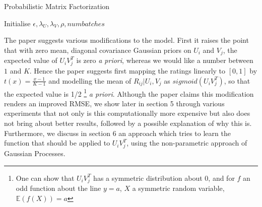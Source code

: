 \documentclass{article}
\theoremstyle{plain}
\begin{document}
\begin{algorithm}
    \SetAlgoNoLine
    \caption{Probabilistic Matrix Factorization}
        \BlankLine
        Initialise $\epsilon,\lambda_U,\lambda_V,\rho ,numbatches$ \;
\end{algorithm}

The paper suggests various modifications to the model. First it raises the point that with zero mean, diagonal covariance Gaussian priors on $U_i$ and $V_j$, the expected value of $U_iV_j^T$ is zero \textit{a priori}, whereas we would like a number between $1$ and $K$. Hence the paper suggests first mapping the ratings linearly to $[0,1]$ by $t(x)=\frac{x-1}{K-1}$ and modelling the mean of $R_{ij}|U_i,V_j$ as $sigmoid(U_iV_j^T)$, so that the expected value is 1/2 \footnote{One can show that $U_iV_j^T$ has a symmetric distribution about 0, and for $f$ an odd function about the line $y=a$, $X$ a symmetric random variable, $\mathbb{E}(f(X))=a$ } \textit{a priori}. Although the paper claims this modification renders an improved RMSE, we show later in section 5 through various experiments that not only is this computationally more expensive but also does not bring about better results, followed by a possible explanation of why this is. Furthermore, we discuss in section 6 an approach which tries to learn the function that should be applied to $U_iV_j^T$, using the non-parametric approach of Gaussian Processes.
\end{document}
